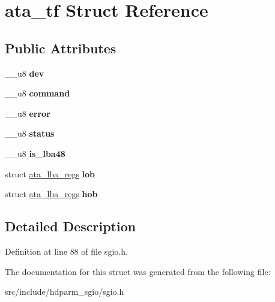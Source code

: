 \hypertarget{structata__tf}{}\section{ata\+\_\+tf Struct Reference}
\label{structata__tf}
\subsection*{Public Attributes}
\begin{DoxyCompactItemize}
\item 
\hypertarget{structata__tf_a1486de591b3e484284f5e6bec64d6b44}{}\+\_\+\+\_\+u8 {\bfseries dev}\label{structata__tf_a1486de591b3e484284f5e6bec64d6b44}

\item 
\hypertarget{structata__tf_a45bddc66726a3b21a541a020e7214926}{}\+\_\+\+\_\+u8 {\bfseries command}\label{structata__tf_a45bddc66726a3b21a541a020e7214926}

\item 
\hypertarget{structata__tf_a82ab6f5b915b0f18152801833431611b}{}\+\_\+\+\_\+u8 {\bfseries error}\label{structata__tf_a82ab6f5b915b0f18152801833431611b}

\item 
\hypertarget{structata__tf_a2f59dc1513d87ba8144019ee124a58ca}{}\+\_\+\+\_\+u8 {\bfseries status}\label{structata__tf_a2f59dc1513d87ba8144019ee124a58ca}

\item 
\hypertarget{structata__tf_addcd6784e2a8ae5d6196866b03793dba}{}\+\_\+\+\_\+u8 {\bfseries is\+\_\+lba48}\label{structata__tf_addcd6784e2a8ae5d6196866b03793dba}

\item 
\hypertarget{structata__tf_a5cbc893dbde986461aae21f389a0e671}{}struct \hyperlink{structata__lba__regs}{ata\+\_\+lba\+\_\+regs} {\bfseries lob}\label{structata__tf_a5cbc893dbde986461aae21f389a0e671}

\item 
\hypertarget{structata__tf_a8cfff592f7a7f11af2a89ad677c445e0}{}struct \hyperlink{structata__lba__regs}{ata\+\_\+lba\+\_\+regs} {\bfseries hob}\label{structata__tf_a8cfff592f7a7f11af2a89ad677c445e0}

\end{DoxyCompactItemize}


\subsection{Detailed Description}


Definition at line 88 of file sgio.\+h.



The documentation for this struct was generated from the following file\+:\begin{DoxyCompactItemize}
\item 
src/include/hdparm\+\_\+sgio/sgio.\+h\end{DoxyCompactItemize}
